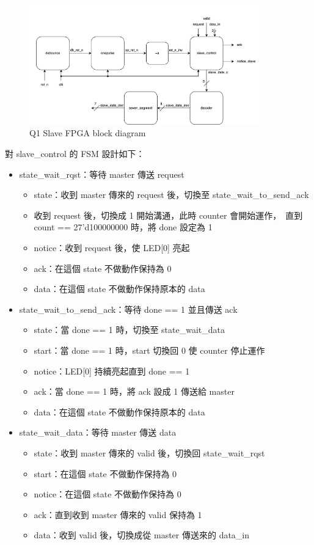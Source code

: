 \documentclass[10.5pt,compsoc,UTF8]{CjC}
\theoremstyle{mystyle}
\begin{document}
\begin{figure}[!h]
  \centering
  \includegraphics[width=0.9\textwidth]{./img/c2c-1.png}
  \caption{Q1 Slave FPGA block diagram}
  \label{fig:c2c-1}
\end{figure}

對 slave\_control 的 FSM 設計如下：
\begin{itemize}
  \item state\_wait\_rqst：等待 master 傳送 request
  \begin{itemize}
    \item state：收到 master 傳來的 request 後，切換至 state\_wait\_to\_send\_ack
    \item 收到 request 後，切換成 1 開始溝通，此時 counter 會開始運作，\
    直到 count == 27'd100000000 時，將 done 設定為 1
    \item notice：收到 request 後，使 LED[0] 亮起
    \item ack：在這個 state 不做動作保持為 0
    \item data：在這個 state 不做動作保持原本的 data
  \end{itemize}
  \item state\_wait\_to\_send\_ack：等待 done == 1 並且傳送 ack
  \begin{itemize}
    \item state：當 done == 1 時，切換至 state\_wait\_data
    \item start：當 done == 1 時，start 切換回 0 使 counter 停止運作
    \item notice：LED[0] 持續亮起直到 done == 1
    \item ack：當 done == 1 時，將 ack 設成 1 傳送給 master
    \item data：在這個 state 不做動作保持原本的 data
  \end{itemize}
  \item state\_wait\_data：等待 master 傳送 data
  \begin{itemize}
    \item state：收到 master 傳來的 valid 後，切換回 state\_wait\_rqst
    \item start：在這個 state 不做動作保持為 0
    \item notice：在這個 state 不做動作保持為 0
    \item ack：直到收到 master 傳來的 valid 保持為 1
    \item data：收到 valid 後，切換成從 master 傳送來的 data\_in
  \end{itemize}
\end{itemize}
\end{document}
